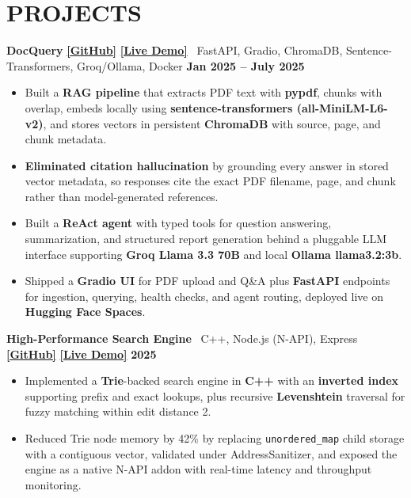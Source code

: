 \documentclass[a4paper,9pt]{extarticle}
\begin{document}
\section*{PROJECTS}
\textbf{DocQuery} \href{https://github.com/blackhat955/DocumenRAG}{\textbf{[GitHub]}} \href{https://huggingface.co/spaces/Durgesh98/document-rag-platform}{\textbf{[Live Demo]}} \textbar\ FastAPI, Gradio, ChromaDB, Sentence-Transformers, Groq/Ollama, Docker \hfill \textbf{Jan 2025 -- July 2025}
\begin{itemize}
  \item Built a \textbf{RAG pipeline} that extracts PDF text with \textbf{pypdf}, chunks with overlap, embeds locally using \textbf{sentence-transformers (all-MiniLM-L6-v2)}, and stores vectors in persistent \textbf{ChromaDB} with source, page, and chunk metadata.
  \item \textbf{Eliminated citation hallucination} by grounding every answer in stored vector metadata, so responses cite the exact PDF filename, page, and chunk rather than model-generated references.
  \item Built a \textbf{ReAct agent} with typed tools for question answering, summarization, and structured report generation behind a pluggable LLM interface supporting \textbf{Groq Llama 3.3 70B} and local \textbf{Ollama llama3.2:3b}.
  \item Shipped a \textbf{Gradio UI} for PDF upload and Q\&A plus \textbf{FastAPI} endpoints for ingestion, querying, health checks, and agent routing, deployed live on \textbf{Hugging Face Spaces}.
\end{itemize}

\textbf{High-Performance Search Engine} \textbar\ C++, Node.js (N-API), Express \href{https://github.com/blackhat955/high_performance_texts_search_engine}{\textbf{[GitHub]}} \href{https://high-performance-texts-search-engine.onrender.com/}{\textbf{[Live Demo]}} \hfill \textbf{2025}
\begin{itemize}
  \item Implemented a \textbf{Trie}-backed search engine in \textbf{C++} with an \textbf{inverted index} supporting prefix and exact lookups, plus recursive \textbf{Levenshtein} traversal for fuzzy matching within edit distance 2.
  \item Reduced Trie node memory by 42\% by replacing \texttt{unordered\_map} child storage with a contiguous vector, validated under AddressSanitizer, and exposed the engine as a native N-API addon with real-time latency and throughput monitoring.
\end{itemize}
\end{document}

